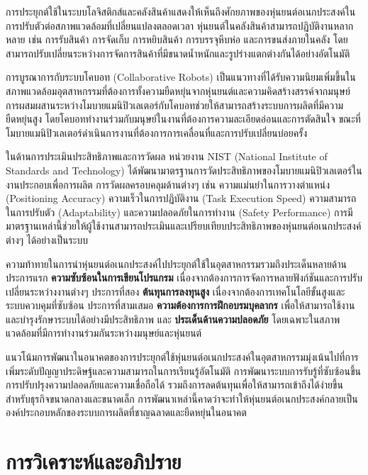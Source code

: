 \documentclass[a4paper]{article}
\begin{document}
การประยุกต์ใช้ในระบบโลจิสติกส์และคลังสินค้าแสดงให้เห็นถึงศักยภาพของหุ่นยนต์อเนกประสงค์ในการปรับตัวต่อสภาพแวดล้อมที่เปลี่ยนแปลงตลอดเวลา หุ่นยนต์ในคลังสินค้าสามารถปฏิบัติงานหลากหลาย เช่น การรับสินค้า การจัดเก็บ การหยิบสินค้า การบรรจุหีบห่อ และการขนส่งภายในคลัง โดยสามารถปรับเปลี่ยนระหว่างการจัดการสินค้าที่มีขนาดน้ำหนักและรูปร่างแตกต่างกันได้อย่างอัตโนมัติ \parencite{xie2024pose}

การบูรณาการกับระบบโคบอท (Collaborative Robots) เป็นแนวทางที่ได้รับความนิยมเพิ่มขึ้นในสภาพแวดล้อมอุตสาหกรรมที่ต้องการทั้งความยืดหยุ่นจากหุ่นยนต์และความคิดสร้างสรรค์จากมนุษย์ \parencite{vitolo2022mobile} การผสมผสานระหว่างโมบายแมนิปิวเลเตอร์กับโคบอทช่วยให้สามารถสร้างระบบการผลิตที่มีความยืดหยุ่นสูง โดยโคบอททำงานร่วมกับมนุษย์ในงานที่ต้องการความละเอียดอ่อนและการตัดสินใจ ขณะที่โมบายแมนิปิวเลเตอร์ดำเนินการงานที่ต้องการการเคลื่อนที่และการปรับเปลี่ยนบ่อยครั้ง

ในด้านการประเมินประสิทธิภาพและการวัดผล หน่วยงาน NIST (National Institute of Standards and Technology) ได้พัฒนามาตรฐานการวัดประสิทธิภาพของโมบายแมนิปิวเลเตอร์ในงานประกอบเพื่อการผลิต \parencite{bostelman2016mobile} การวัดผลครอบคลุมด้านต่างๆ เช่น ความแม่นยำในการวางตำแหน่ง (Positioning Accuracy) ความเร็วในการปฏิบัติงาน (Task Execution Speed) ความสามารถในการปรับตัว (Adaptability) และความปลอดภัยในการทำงาน (Safety Performance) การมีมาตรฐานเหล่านี้ช่วยให้ผู้ใช้งานสามารถประเมินและเปรียบเทียบประสิทธิภาพของหุ่นยนต์อเนกประสงค์ต่างๆ ได้อย่างเป็นระบบ

ความท้าทายในการนำหุ่นยนต์อเนกประสงค์ไปประยุกต์ใช้ในอุตสาหกรรมรวมถึงประเด็นหลายด้าน ประการแรก \textbf{ความซับซ้อนในการเขียนโปรแกรม} เนื่องจากต้องการการจัดการหลายฟังก์ชันและการปรับเปลี่ยนระหว่างงานต่างๆ ประการที่สอง \textbf{ต้นทุนการลงทุนสูง} เนื่องจากต้องการเทคโนโลยีขั้นสูงและระบบควบคุมที่ซับซ้อน ประการที่สามเสมอ \textbf{ความต้องการการฝึกอบรมบุคลากร} เพื่อให้สามารถใช้งานและบำรุงรักษาระบบได้อย่างมีประสิทธิภาพ และ \textbf{ประเด็นด้านความปลอดภัย} โดยเฉพาะในสภาพแวดล้อมที่มีการทำงานร่วมกันระหว่างมนุษย์และหุ่นยนต์

แนวโน้มการพัฒนาในอนาคตของการประยุกต์ใช้หุ่นยนต์อเนกประสงค์ในอุตสาหกรรมมุ่งเน้นไปที่การเพิ่มระดับปัญญาประดิษฐ์และความสามารถในการเรียนรู้อัตโนมัติ การพัฒนาระบบการรับรู้ที่ซับซ้อนขึ้น การปรับปรุงความปลอดภัยและความเชื่อถือได้ รวมถึงการลดต้นทุนเพื่อให้สามารถเข้าถึงได้ง่ายขึ้นสำหรับธุรกิจขนาดกลางและขนาดเล็ก การพัฒนาเหล่านี้คาดว่าจะทำให้หุ่นยนต์อเนกประสงค์กลายเป็นองค์ประกอบหลักของระบบการผลิตที่ชาญฉลาดและยืดหยุ่นในอนาคต

\section{การวิเคราะห์และอภิปราย}
\end{document}

